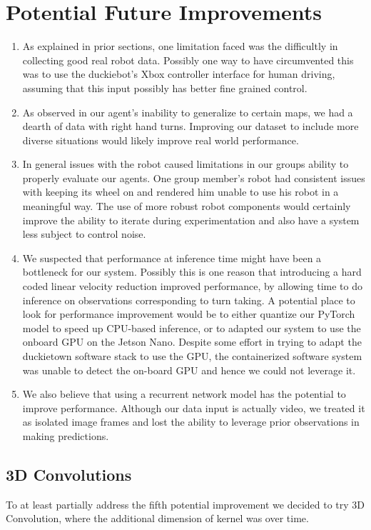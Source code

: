 \documentclass{article}
\begin{document}
\section{Potential Future Improvements}
\begin{enumerate}
    \item As explained in prior sections, one limitation faced was the difficultly in collecting good real robot data. Possibly one way to have circumvented this was to use the duckiebot's Xbox controller interface for human driving, assuming that this input possibly has better fine grained control.
    \item As observed in our agent's inability to generalize to certain maps, we had a dearth of data with right hand turns. Improving our dataset to include more diverse situations would likely improve real world performance.
    \item In general issues with the robot caused limitations in our groups ability to properly evaluate our agents. One group member's robot had consistent issues with keeping its wheel on and rendered him unable to use his robot in a meaningful way. The use of more robust robot components would certainly improve the ability to iterate during experimentation and also have a system less subject to control noise.
    \item We suspected that performance at inference time might have been a bottleneck for our system. Possibly this is one reason that introducing a hard coded linear velocity reduction improved performance, by allowing time to do inference on observations corresponding to turn taking. A potential place to look for performance improvement would be to either quantize our PyTorch model to speed up CPU-based inference, or to adapted our system to use the onboard GPU on the Jetson Nano. Despite some effort in trying to adapt the duckietown software stack to use the GPU, the containerized software system was unable to detect the on-board GPU and hence we could not leverage it.
    \item We also believe that using a recurrent network model has the potential to improve performance. Although our data input is actually video, we treated it as isolated image frames and lost the ability to leverage prior observations in making predictions.
\end{enumerate}

\subsection{3D Convolutions}
To at least partially address the fifth potential improvement we decided to try 3D Convolution, where the additional dimension of kernel was over time.
\end{document}
